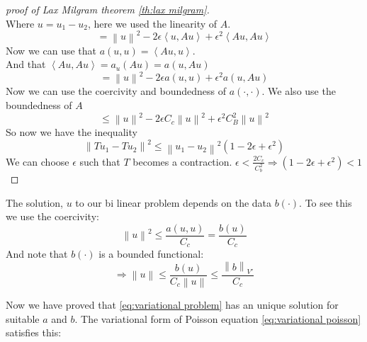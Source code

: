 \documentclass[../Main/main.tex]{subfiles}
\begin{document}
\begin{proof}[proof of Lax Milgram theorem \ref{th:lax milgram}]
\begin{equation*}
		\end{equation*}
		Where $u = u_1 - u_2$, here we used the linearity of $A$.
		\begin{equation*}
			=\left \| u \right \|^2 - 2 \epsilon \left \langle u,Au \right \rangle + \epsilon^2 \left \langle Au,Au \right\rangle
		\end{equation*}
		Now we can use that $a(u,u)=\left \langle Au,u \right \rangle$.\\
		And that $\left \langle Au,Au \right \rangle = a_u(Au) = a(u,Au)$ 
		\begin{equation*}
			=\left \| u \right \|^2 - 2\epsilon a(u,u) + \epsilon^2 a(u,Au)
		\end{equation*}
		Now we can use the coercivity and boundedness of $a(\cdot,\cdot)$. We also use the boundedness of $A$
		\begin{equation*}
			\leq \left \|u  \right \|^2 -2\epsilon C_c \left \| u \right \|^2 + \epsilon^2 C_B^2 \left \|u  \right \|^2
		\end{equation*}
		So now we have the inequality
		\begin{equation*}
			\left \| Tu_1 -Tu_2 \right \|^2 \leq \left \| u_1 - u_2 \right \|^2 (1-2\epsilon + \epsilon^2)
		\end{equation*}
		We can choose $\epsilon$ such that $T$ becomes a contraction.
		$\epsilon < \frac{2 C_c}{C_b^2} \Rightarrow (1-2\epsilon + \epsilon^2)<1$
	\end{proof}
	\begin{remark}\label{rm:stability}
		The solution, $u$ to our bi linear problem depends on the data $b(\cdot)$. To see this we use the coercivity:
		\begin{equation*}
			\left \| u \right \|^2 \leq \frac{a(u,u)}{C_c} = \frac{b(u)}{C_c}
		\end{equation*}
		And note that $b(\cdot)$ is a bounded functional:
		\begin{equation*}
			\Rightarrow \left \| u \right \| \leq \frac{b(u)}{C_c \left \|u\right \|} \leq \frac{\left \| b \right \|_{V'}}{C_c}
		\end{equation*}
	\end{remark}
	Now we have proved that \eqref{eq:variational problem} has an unique solution for suitable $a$ and $b$. The variational form of Poisson equation \eqref{eq:variational poisson} satisfies this:
\end{document}
